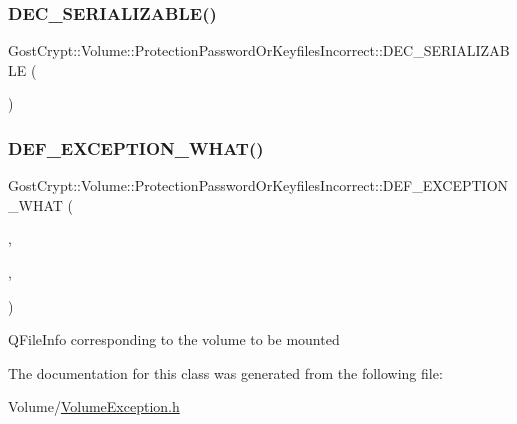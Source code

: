 \subsubsection{\texorpdfstring{D\+E\+C\+\_\+\+S\+E\+R\+I\+A\+L\+I\+Z\+A\+B\+L\+E()}{DEC\_SERIALIZABLE()}}
{\footnotesize\ttfamily Gost\+Crypt\+::\+Volume\+::\+Protection\+Password\+Or\+Keyfiles\+Incorrect\+::\+D\+E\+C\+\_\+\+S\+E\+R\+I\+A\+L\+I\+Z\+A\+B\+LE (\begin{DoxyParamCaption}\item[{\hyperlink{class_gost_crypt_1_1_volume_1_1_protection_password_or_keyfiles_incorrect}{Protection\+Password\+Or\+Keyfiles\+Incorrect}}]{ }\end{DoxyParamCaption})}

\mbox{\label{class_gost_crypt_1_1_volume_1_1_protection_password_or_keyfiles_incorrect_a438c711d3484c557bbd0c800a1762a3c}} 
\subsubsection{\texorpdfstring{D\+E\+F\+\_\+\+E\+X\+C\+E\+P\+T\+I\+O\+N\+\_\+\+W\+H\+A\+T()}{DEF\_EXCEPTION\_WHAT()}}
{\footnotesize\ttfamily Gost\+Crypt\+::\+Volume\+::\+Protection\+Password\+Or\+Keyfiles\+Incorrect\+::\+D\+E\+F\+\_\+\+E\+X\+C\+E\+P\+T\+I\+O\+N\+\_\+\+W\+H\+AT (\begin{DoxyParamCaption}\item[{\hyperlink{class_gost_crypt_1_1_volume_1_1_protection_password_or_keyfiles_incorrect}{Protection\+Password\+Or\+Keyfiles\+Incorrect}}]{,  }\item[{\hyperlink{class_gost_crypt_1_1_volume_1_1_volume_exception}{Volume\+Exception}}]{,  }\item[{\char`\"{}The given password or keyfiles for hidden volume (\char`\"{}+volume\+Path.\+canonical\+File\+Path()+\char`\"{}) are incorrect.\char`\"{}}]{ }\end{DoxyParamCaption})}

Q\+File\+Info corresponding to the volume to be mounted 

The documentation for this class was generated from the following file\+:\begin{DoxyCompactItemize}
\item 
Volume/\hyperlink{_volume_exception_8h}{Volume\+Exception.\+h}\end{DoxyCompactItemize}
